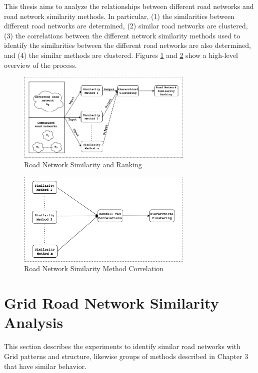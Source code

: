 
This thesis aims to analyze the relationships between different road networks and road network similarity methods. In particular,  (1) the similarities between different road networks are determined, (2) similar road networks are clustered, (3) the correlations between the different network similarity methods used to identify the similarities between the different road networks are also determined, and (4) the similar methods are clustered. Figures \ref{fig:Road Network Similarity and Ranking} and \ref{fig:Road Network Similarity Method Correlation} show a high-level overview of the process. 

\begin{figure}[h]
\centering
\includegraphics[width=0.75\textwidth,center]{picture/network_ranking.png}
\caption[Road Network Similarity and Ranking]{Road Network Similarity and Ranking}
\label{fig:Road Network Similarity and Ranking}
\end{figure}

\begin{figure}[!ht]
\centering
\includegraphics[width=0.75\textwidth,center]{picture/ranking.png}
\caption[Road Network Similarity Method Correlation]{Road Network Similarity Method Correlation}
\label{fig:Road Network Similarity Method Correlation}
\end{figure}


\section{Grid Road Network Similarity Analysis}
\label{4.1}
This section describes the experiments to identify similar road networks with Grid patterns and structure, likewise groups of methods described in Chapter 3 that have similar behavior.

